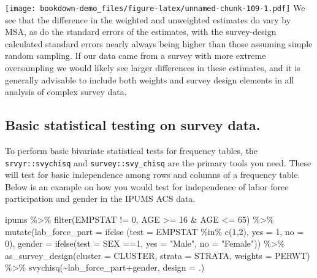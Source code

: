\documentclass[
]{article}
\newenvironment{Shaded}{\begin{snugshade}}{\end{snugshade}}
\newcommand{\AttributeTok}[1]{\textcolor[rgb]{0.77,0.63,0.00}{#1}}
\newcommand{\DecValTok}[1]{\textcolor[rgb]{0.00,0.00,0.81}{#1}}
\newcommand{\FunctionTok}[1]{\textcolor[rgb]{0.00,0.00,0.00}{#1}}
\newcommand{\NormalTok}[1]{#1}
\newcommand{\SpecialCharTok}[1]{\textcolor[rgb]{0.00,0.00,0.00}{#1}}
\newcommand{\StringTok}[1]{\textcolor[rgb]{0.31,0.60,0.02}{#1}}
\begin{document}
\texttt{[image: bookdown-demo\_files/figure-latex/unnamed-chunk-109-1.pdf]}
We see that the difference in the weighted and unweighted estimates do vary by MSA, as do the standard errors of the estimates, with the survey-design calculated standard errors nearly always being higher than those assuming simple random sampling. If our data came from a survey with more extreme oversampling we would likely see larger differences in these estimates, and it is generally advisable to include both weights and survey design elements in all analysis of complex survey data.

\hypertarget{basic-statistical-testing-on-survey-data.}{%
\subsection{Basic statistical testing on survey data.}\label{basic-statistical-testing-on-survey-data.}}

To perform basic bivariate statistical tests for frequency tables, the \texttt{srvyr::svychisq} and \texttt{survey::svy\_chisq} are the primary tools you need. These will test for basic independence among rows and columns of a frequency table. Below is an example on how you would test for independence of labor force participation and gender in the IPUMS ACS data.

\begin{Shaded}
\begin{Highlighting}[]
\NormalTok{ipums }\SpecialCharTok{\%\textgreater{}\%}
  \FunctionTok{filter}\NormalTok{(EMPSTAT }\SpecialCharTok{!=} \DecValTok{0}\NormalTok{,}
\NormalTok{         AGE }\SpecialCharTok{\textgreater{}=} \DecValTok{16} \SpecialCharTok{\&}\NormalTok{ AGE }\SpecialCharTok{\textless{}=} \DecValTok{65}\NormalTok{) }\SpecialCharTok{\%\textgreater{}\%}
  \FunctionTok{mutate}\NormalTok{(}\AttributeTok{lab\_force\_part =} \FunctionTok{ifelse}\NormalTok{ (}\AttributeTok{test =}\NormalTok{ EMPSTAT }\SpecialCharTok{\%in\%} \FunctionTok{c}\NormalTok{(}\DecValTok{1}\NormalTok{,}\DecValTok{2}\NormalTok{),}
                                  \AttributeTok{yes =} \DecValTok{1}\NormalTok{,}
                                  \AttributeTok{no =} \DecValTok{0}\NormalTok{), }
         \AttributeTok{gender =} \FunctionTok{ifelse}\NormalTok{(}\AttributeTok{test =}\NormalTok{ SEX }\SpecialCharTok{==}\DecValTok{1}\NormalTok{,}
                         \AttributeTok{yes =} \StringTok{"Male"}\NormalTok{,}
                         \AttributeTok{no =} \StringTok{"Female"}\NormalTok{)) }\SpecialCharTok{\%\textgreater{}\%}
  \FunctionTok{as\_survey\_design}\NormalTok{(}\AttributeTok{cluster =}\NormalTok{ CLUSTER,}
                   \AttributeTok{strata =}\NormalTok{ STRATA,}
                   \AttributeTok{weights =}\NormalTok{ PERWT) }\SpecialCharTok{\%\textgreater{}\%}
  \FunctionTok{svychisq}\NormalTok{(}\SpecialCharTok{\textasciitilde{}}\NormalTok{lab\_force\_part}\SpecialCharTok{+}\NormalTok{gender,}
                    \AttributeTok{design =}\NormalTok{ .)}
\end{Highlighting}
\end{Shaded}
\end{document}
